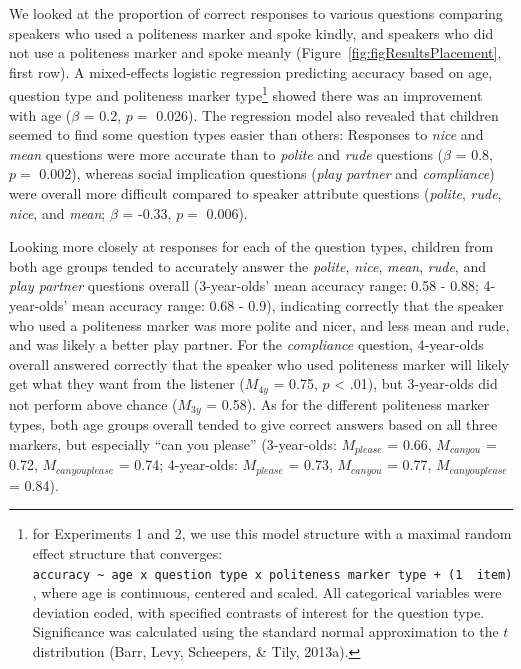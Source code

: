 \documentclass[oneside]{report}
\begin{document}
We looked at the proportion of correct responses to various questions
comparing speakers who used a politeness marker and spoke kindly, and
speakers who did not use a politeness marker and spoke meanly
(Figure~\ref{fig:figResultsPlacement}, first row). A mixed-effects
logistic regression predicting accuracy based on age, question type and
politeness marker type\footnote{for Experiments 1 and 2, we use this
  model structure with a maximal random effect structure that converges:
  \texttt{accuracy\ \textasciitilde{}\ age\ x\ question\ type\ x\ politeness\ marker\ type\ +\ (1\ \textbar{}\ item)},
  where age is continuous, centered and scaled. All categorical
  variables were deviation coded, with specified contrasts of interest
  for the question type. Significance was calculated using the standard
  normal approximation to the \(t\) distribution (Barr, Levy, Scheepers,
  \& Tily, 2013a).} showed there was an improvement with age (\(\beta\)
= 0.2, \(p =\) 0.026). The regression model also revealed that children
seemed to find some question types easier than others: Responses to
\emph{nice} and \emph{mean} questions were more accurate than to
\emph{polite} and \emph{rude} questions (\(\beta\) = 0.8, \(p =\)
0.002), whereas social implication questions (\emph{play partner} and
\emph{compliance}) were overall more difficult compared to speaker
attribute questions (\emph{polite}, \emph{rude}, \emph{nice}, and
\emph{mean}; \(\beta\) = -0.33, \(p =\) 0.006).

Looking more closely at responses for each of the question types,
children from both age groups tended to accurately answer the
\emph{polite}, \emph{nice}, \emph{mean}, \emph{rude}, and \emph{play
partner} questions overall (3-year-olds' mean accuracy range: 0.58 -
0.88; 4-year-olds' mean accuracy range: 0.68 - 0.9), indicating
correctly that the speaker who used a politeness marker was more polite
and nicer, and less mean and rude, and was likely a better play partner.
For the \emph{compliance} question, 4-year-olds overall answered
correctly that the speaker who used politeness marker will likely get
what they want from the listener (\(M_{4y}\) = 0.75, \(p\) \textless{}
.01), but 3-year-olds did not perform above chance (\(M_{3y}\) = 0.58).
As for the different politeness marker types, both age groups overall
tended to give correct answers based on all three markers, but
especially ``can you please'' (3-year-olds: \(M_{please}\) = 0.66,
\(M_{can you}\) = 0.72, \(M_{can you please}\) = 0.74; 4-year-olds:
\(M_{please}\) = 0.73, \(M_{can you}\) = 0.77, \(M_{can you please}\) =
0.84).
\end{document}
